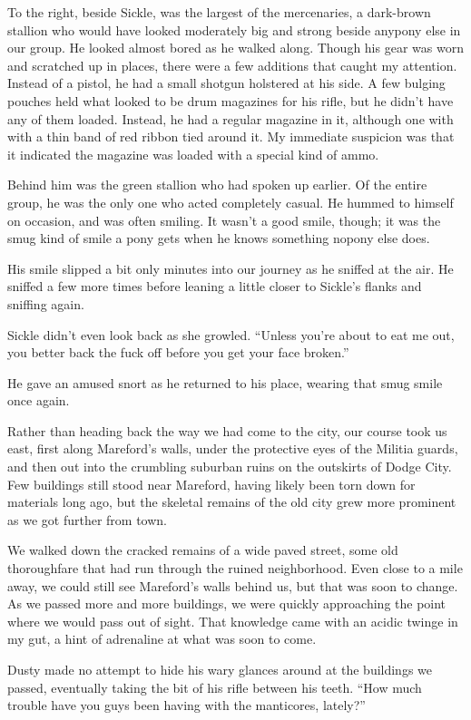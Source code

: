 To the right, beside Sickle, was the largest of the mercenaries, a dark-brown stallion who would have looked moderately big and strong beside anypony else in our group. He looked almost bored as he walked along. Though his gear was worn and scratched up in places, there were a few additions that caught my attention. Instead of a pistol, he had a small shotgun holstered at his side. A few bulging pouches held what looked to be drum magazines for his rifle, but he didn’t have any of them loaded. Instead, he had a regular magazine in it, although one with with a thin band of red ribbon tied around it. My immediate suspicion was that it indicated the magazine was loaded with a special kind of ammo.

Behind him was the green stallion who had spoken up earlier. Of the entire group, he was the only one who acted completely casual. He hummed to himself on occasion, and was often smiling. It wasn’t a good smile, though; it was the smug kind of smile a pony gets when he knows something nopony else does.

His smile slipped a bit only minutes into our journey as he sniffed at the air. He sniffed a few more times before leaning a little closer to Sickle’s flanks and sniffing again.

Sickle didn’t even look back as she growled. “Unless you’re about to eat me out, you better back the fuck off before you get your face broken.”

He gave an amused snort as he returned to his place, wearing that smug smile once again.

Rather than heading back the way we had come to the city, our course took us east, first along Mareford’s walls, under the protective eyes of the Militia guards, and then out into the crumbling suburban ruins on the outskirts of Dodge City. Few buildings still stood near Mareford, having likely been torn down for materials long ago, but the skeletal remains of the old city grew more prominent as we got further from town.

We walked down the cracked remains of a wide paved street, some old thoroughfare that had run through the ruined neighborhood. Even close to a mile away, we could still see Mareford’s walls behind us, but that was soon to change. As we passed more and more buildings, we were quickly approaching the point where we would pass out of sight. That knowledge came with an acidic twinge in my gut, a hint of adrenaline at what was soon to come.

Dusty made no attempt to hide his wary glances around at the buildings we passed, eventually taking the bit of his rifle between his teeth. “How much trouble have you guys been having with the manticores, lately?”

